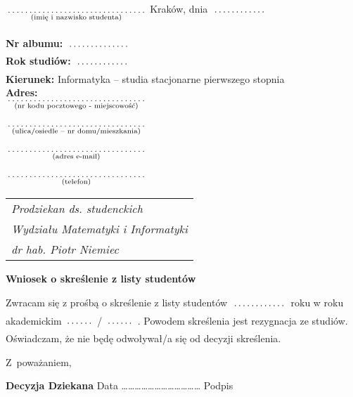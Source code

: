 \documentclass[a4paper,11pt]{article}
\newcommand{\fillField}[2]{
    $\underset{\text{#1}}{\parbox[t]{#2}{\dotfill}}$
}
\begin{document}
\noindent
\fillField{(imię i nazwisko studenta)}{5cm} \hfill Kraków, dnia \fillField{}{2cm} \\\\
\textbf{Nr albumu:}   \fillField{}{2.3cm}\\
\textbf{Rok studiów:} \fillField{}{2cm}\\
\textbf{Kierunek:} Informatyka -- studia stacjonarne pierwszego stopnia\\
\textbf{Adres:}\\
\fillField{(nr kodu pocztowego - miejscowość)}{5cm}\\\\
\fillField{(ulica/osiedle – nr domu/mieszkania)}{5cm}\\\\
\fillField{(adres e-mail)}{5cm}\\\\
\fillField{(telefon)}{5cm}


\phantom{a}\hfill
\begin{tabular}[c]{@{}l@{}}
\textit{Prodziekan ds. studenckich} \\
\textit{Wydziału Matematyki i Informatyki}\\
\textit{dr hab. Piotr Niemiec}
\end{tabular}

\vskip 2.0cm

\begin{center}
{\Large \textbf{Wniosek o skreślenie z listy studentów}}
\end{center}

\vskip 0.5cm

Zwracam się z prośbą o skreślenie z listy studentów \fillField{}{2cm} roku w roku akademickim \fillField{}{1cm}/\fillField{}{1cm}. Powodem skreślenia jest rezygnacja ze studiów.
Oświadczam, że nie będę odwoływał/a się od decyzji skreślenia.


\vskip 2.0cm

\hspace{\fill} Z~poważaniem, \hspace{2.0cm}
\vskip 4.0cm

\noindent
\textbf{Decyzja Dziekana} \dotfill
\vskip 0.5cm
\noindent
Data ……………………………… Podpis \dotfill
\end{document}
